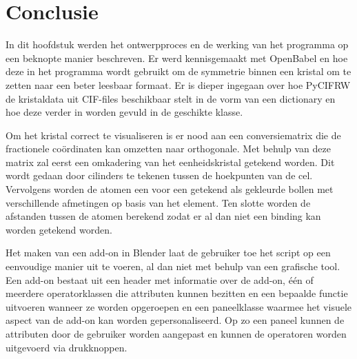 \section{Conclusie}
In dit hoofdstuk werden het ontwerpproces en de werking van het programma op een beknopte manier beschreven. Er werd kennisgemaakt met OpenBabel en hoe deze in het programma wordt gebruikt om de symmetrie binnen een kristal om te zetten naar een beter leesbaar formaat. Er is dieper ingegaan over hoe PyCIFRW de kristaldata uit CIF-files beschikbaar stelt in de vorm van een dictionary en hoe deze verder in worden gevuld in de geschikte klasse.
\par
Om het kristal correct te visualiseren is er nood aan een conversiematrix die de fractionele coördinaten kan omzetten naar orthogonale. Met behulp van deze matrix zal eerst een omkadering van het eenheidskristal getekend worden. Dit wordt gedaan door cilinders te tekenen tussen de hoekpunten van de cel. Vervolgens worden de atomen een voor een getekend als gekleurde bollen met verschillende afmetingen op basis van het element. Ten slotte worden de afstanden tussen de atomen berekend zodat er al dan niet een binding kan worden getekend worden.
\par
Het maken van een add-on in Blender laat de gebruiker toe het script op een eenvoudige manier uit te voeren, al dan niet met behulp van een grafische tool. Een add-on bestaat uit een header met informatie over de add-on, één of meerdere operatorklassen die attributen kunnen bezitten en een bepaalde functie uitvoeren wanneer ze worden opgeroepen en een paneelklasse waarmee het visuele aspect van de add-on kan worden gepersonaliseerd. Op zo een paneel kunnen de attributen door de gebruiker worden aangepast en kunnen de operatoren worden uitgevoerd via drukknoppen.  



 



  






